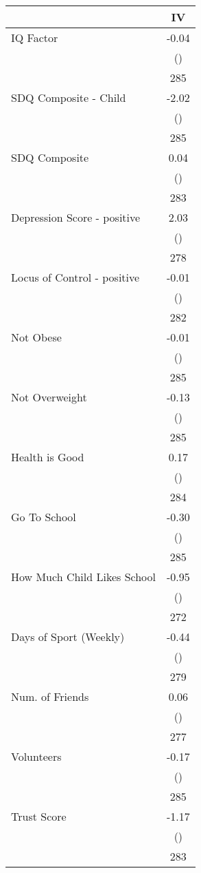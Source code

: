 \begin{tabular}{l c}
\toprule
 & IV \\
\midrule
IQ Factor & -0.04 \\
& () \\
& 285 \\
SDQ Composite - Child & -2.02 \\
& () \\
& 285 \\
SDQ Composite & 0.04 \\
& () \\
& 283 \\
Depression Score - positive & 2.03 \\
& () \\
& 278 \\
Locus of Control - positive & -0.01 \\
& () \\
& 282 \\
Not Obese & -0.01 \\
& () \\
& 285 \\
Not Overweight & -0.13 \\
& () \\
& 285 \\
Health is Good & 0.17 \\
& () \\
& 284 \\
Go To School & -0.30 \\
& () \\
& 285 \\
How Much Child Likes School & -0.95 \\
& () \\
& 272 \\
Days of Sport (Weekly) & -0.44 \\
& () \\
& 279 \\
Num. of Friends & 0.06 \\
& () \\
& 277 \\
Volunteers & -0.17 \\
& () \\
& 285 \\
Trust Score & -1.17 \\
& () \\
& 283 \\
\bottomrule
\end{tabular}
